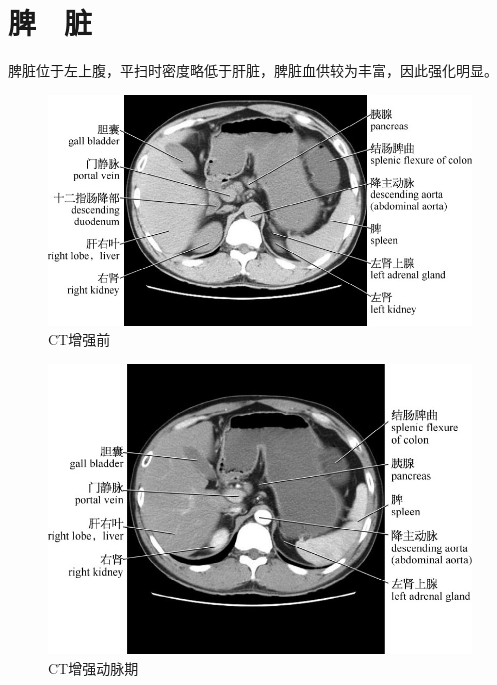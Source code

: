 \section{脾　脏}

脾脏位于左上腹，平扫时密度略低于肝脏，脾脏血供较为丰富，因此强化明显。

\begin{figure}[!htbp]
 \centering
 \includegraphics{./images/Image00143.jpg}
 \captionsetup{justification=centering}
 \caption{CT增强前}
  \end{figure} 
 \FloatBarrier

\begin{figure}[!htbp]
 \centering
 \includegraphics{./images/Image00144.jpg}
 \captionsetup{justification=centering}
 \caption{CT增强动脉期}
  \end{figure} 
 \FloatBarrier


